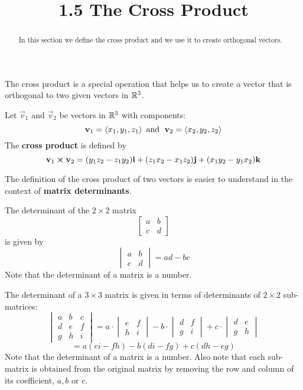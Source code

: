 \documentclass[handout]{ximera}
\title{1.5 The Cross Product}
\begin{document}
\begin{abstract}
In this section we define the cross product and we use it to create orthogonal vectors.
\end{abstract}
 
\maketitle
The cross product is a special operation that helps us to create a vector that is orthogonal to two given vectors in $\mathbb R^3$.
\begin{definition}
Let $\vec{v}_1$ and $\vec{v}_2$ be vectors in $\mathbb R^3$ with components:
\[
\mathbf{v}_1 = \left\langle x_1, y_1, z_1\right\rangle \text{  and   } \;\mathbf{v}_2 = \left\langle x_2, y_2, z_2\right\rangle
\]
The \textbf{cross product} is defined by
\[
\mathbf{v}_1 \boldsymbol\times \mathbf{v}_2 =  (y_1z_2 - z_1y_2) \mathbf{i} + (z_1x_2 - x_1z_2) \mathbf{j} + (x_1y_2 - y_1x_2) \mathbf{k} 
\]
\end{definition}

The definition of the cross product of two vectors is easier to understand in the context of \textbf{matrix determinants}.

\begin{definition}
The determinant of the $2 \times 2$ matrix 
\[
\begin{bmatrix}
a & b\\
c & d
\end{bmatrix}
\]
is  given by
\[
\begin{vmatrix}
a & b\\
c & d
\end{vmatrix}
= ad-bc
\]
Note that the determinant of a matrix is a number.
\end{definition}

\begin{definition}
The determinant of a $3 \times 3$ matrix is given in terms of determinants of $2 \times 2$ sub-matrices:
\[
\begin{vmatrix}
a & b & c\\
d & e & f\\
g & h & i
\end{vmatrix}
= a \cdot
\begin{vmatrix}
 e & f\\
 h & i
\end{vmatrix}
-b\cdot
\begin{vmatrix}
d  & f\\
g  & i
\end{vmatrix}
+c \cdot
\begin{vmatrix}
d & e \\
g & h 
\end{vmatrix}
\]
\[
= a(ei-fh) - b(di-fg) + c(dh-eg)
\]
Note that the determinant of a matrix is a number. 
Also note that each sub-matrix is obtained from the original matrix by removing the row and column of its coefficient, $a, b$ or $c$. 
\end{definition}
\end{document}
